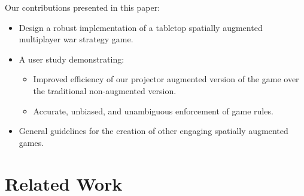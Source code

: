 \documentclass[10pt,twocolumn,letterpaper]{article}
\begin{document}
\vspace{0.05in}
\noindent
Our contributions presented in this paper:\vspace{-0.1in}

\begin{itemize}

\item Design a robust implementation of a tabletop spatially augmented
  multiplayer war strategy game.\vspace{-0.1in}
  
\item A user study demonstrating:\vspace{-0.12in}

\begin{itemize}

\item Improved efficiency of our projector augmented version of the game over
  the traditional non-augmented version.\vspace{-0.05in}

\item Accurate, unbiased, and unambiguous enforcement of game
  rules. \vspace{-0.12in}

\end{itemize}

\item General guidelines for the creation of other engaging spatially
  augmented games.



\end{itemize}



\section{Related Work}
\label{section:related_work}
\end{document}

